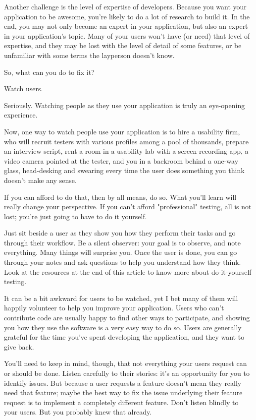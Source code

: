 Another challenge is the level of expertise of developers. Because you want your application to be awesome, you're likely to do a lot of research to build it. In the end, you may not only become an expert in your application, but also an expert in your application's topic. Many of your users won't have (or need) that level of expertise, and they may be lost with the level of detail of some features, or be unfamiliar with some terms the layperson doesn't know.

So, what can you do to fix it?

Watch users.

Seriously. Watching people as they use your application is truly an eye-opening experience.

Now, one way to watch people use your application is to hire a usability firm, who will recruit testers with various profiles among a pool of thousands, prepare an interview script, rent a room in a usability lab with a screen-recording app, a video camera pointed at the tester, and you in a backroom behind a one-way glass, head-desking and swearing every time the user does something you think doesn't make any sense.

If you can afford to do that, then by all means, do so. What you'll learn will really change your perspective. If you can't afford "professional" testing, all is not lost; you're just going to have to do it yourself.

Just sit beside a user as they show you how they perform their tasks and go through their workflow. Be a silent observer: your goal is to observe, and note everything. Many things will surprise you. Once the user is done, you can go through your notes and ask questions to help you understand how they think. Look at the resources at the end of this article to know more about do-it-yourself testing.

It can be a bit awkward for users to be watched, yet I bet many of them will happily volunteer to help you improve your application. Users who can't contribute code are usually happy to find other ways to participate, and showing you how they use the software is a very easy way to do so. Users are generally grateful for the time you've spent developing the application, and they want to give back.

You'll need to keep in mind, though, that not everything your users request can or should be done. Listen carefully to their stories: it's an opportunity for you to identify issues. But because a user requests a feature doesn't mean they really need that feature; maybe the best way to fix the issue underlying their feature request is to implement a completely different feature. Don't listen blindly to your users. But you probably knew that already. 

